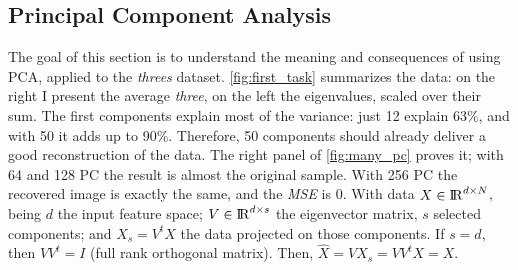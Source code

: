 \documentclass[a4paper, 10pt]{article}
\begin{document}
  \subsection{Principal Component Analysis}
  The goal of this section is to understand the meaning and consequences of using
  PCA, applied to the \emph{threes} dataset. \autoref{fig:first_task} summarizes the data:
  on the right I present the average \emph{three}, on the left the eigenvalues, 
  scaled over their sum. The first components explain most of the variance:
  just 12 explain 63\%, and with 50 it adds up to 90\%. Therefore, 50 components 
  should already deliver a good reconstruction of the data. The right panel
  of \autoref{fig:many_pc} proves it; with 64 and 128 PC the result
  is almost the original sample. With 256 PC the recovered image is exactly
  the same, and the \emph{MSE} is 0. With data $X \in {\rm I\!R}^{d \times N}$,
  being $d$ the input feature space; $V \in {\rm I\!R}^{d \times s}$ the
  eigenvector matrix, $s$ selected components; and $X_s=V^{t}X$ the data
  projected on those components. If $s=d$, then $VV^{t}=I$ (full rank orthogonal matrix).
  Then, $\hat{X} = VX_s = VV^{t}X = X$. 
\end{document}
